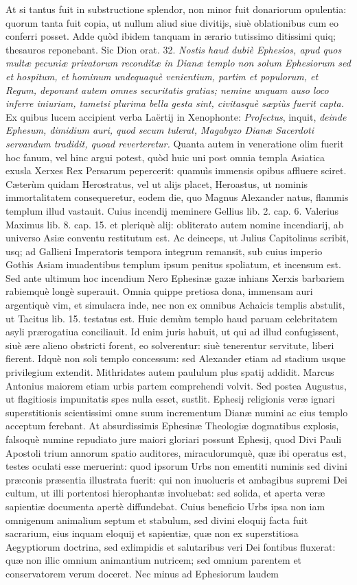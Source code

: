 \documentclass[a4paper, 11pt, oneside, polutonikogreek, latin]{article}
\begin{document}
At si tantus fuit in substructione splendor, non minor fuit donariorum opulentia: quorum tanta fuit copia, ut nullum aliud siue divitijs, siuè oblationibus cum eo conferri posset. Adde quòd ibidem tanquam in ærario tutissimo ditissimi quiq; thesauros reponebant. Sic Dion orat. 32. \emph{Nostis haud dubiè Ephesios, apud quos multæ pecuniæ privatorum reconditæ in Dianæ templo non solum Ephesiorum sed et hospitum, et hominum undequaquè venientium, partim et populorum, et Regum, deponunt autem omnes securitatis gratias; nemine unquam auso loco inferre iniuriam, tametsi plurima bella gesta sint, civitasquè sæpiùs fuerit capta.} Ex quibus lucem accipient verba Laërtij in Xenophonte: \emph{Profectus}, inquit, \emph{deinde Ephesum, dimidium auri, quod secum tulerat, Magabyzo Dianæ Sacerdoti servandum tradidit, quoad reverteretur.} Quanta autem in veneratione olim fuerit hoc fanum, vel hinc argui potest, quòd huic uni post omnia templa Asiatica exusla Xerxes Rex Persarum pepercerit: quamuìs immensis opibus affluere sciret. Cæterùm quidam Herostratus, vel ut alijs placet, Heroastus, ut nominis immortalitatem consequeretur, eodem die, quo Magnus Alexander natus, flammis templum illud vastauit. Cuius incendij meminere Gellius lib. 2. cap. 6. Valerius Maximus lib. 8. cap. 15. et pleriquè alij: obliterato autem nomine incendiarij, ab universo Asiæ conventu restitutum est. Ac deinceps, ut Julius Capitolinus scribit, usq; ad Gallieni Imperatoris tempora integrum remansit, sub cuius imperio Gothis Asiam inuadentibus templum ipsum penitus spoliatum, et incensum est. Sed ante ultimum hoc incendium Nero Ephesinæ gazæ inhians Xerxis barbariem rabiemquè longè superauit. Omnia quippe pretiosa dona, immensam auri argentiquè vim, et simulacra inde, nec non ex omnibus Achaicis templis abstulit, ut Tacitus lib. 15. testatus est. Huic demùm templo haud paruam celebritatem asyli prærogatiua conciliauit. Id enim juris habuit, ut qui ad illud confugissent, siuè ære alieno obstricti forent, eo solverentur: siuè tenerentur servitute, liberi fierent. Idquè non soli templo concessum: sed Alexander etiam ad stadium usque privilegium extendit. Mithridates autem paululum plus spatij addidit. Marcus Antonius maiorem etiam urbis partem comprehendi volvit. Sed postea Augustus, ut flagitiosis impunitatis spes nulla esset, sustlit. Ephesij religionis veræ ignari superstitionis scientissimi omne suum incrementum Dianæ numini ac eius templo acceptum ferebant. At absurdissimis Ephesinæ Theologiæ dogmatibus explosis, falsoquè numine repudiato jure maiori gloriari possunt Ephesij, quod Divi Pauli Apostoli trium annorum spatio auditores, miraculorumquè, quæ ibi operatus est, testes oculati esse meruerint: quod ipsorum Urbs non ementiti numinis sed divini præconis præsentia illustrata fuerit: qui non inuolucris et ambagibus supremi Dei cultum, ut illi portentosi hierophantæ involuebat: sed solida, et aperta veræ sapientiæ documenta apertè diffundebat. Cuius beneficio Urbs ipsa non iam omnigenum animalium septum et stabulum, sed divini eloquij facta fuit sacrarium, eius inquam eloquij et sapientiæ, quæ non ex superstitiosa Aegyptiorum doctrina, sed exlimpidis et salutaribus veri Dei fontibus fluxerat: quæ non illic omnium animantium nutricem; sed omnium parentem et conservatorem verum doceret. Nec minus ad Ephesiorum laudem 
\end{document}
